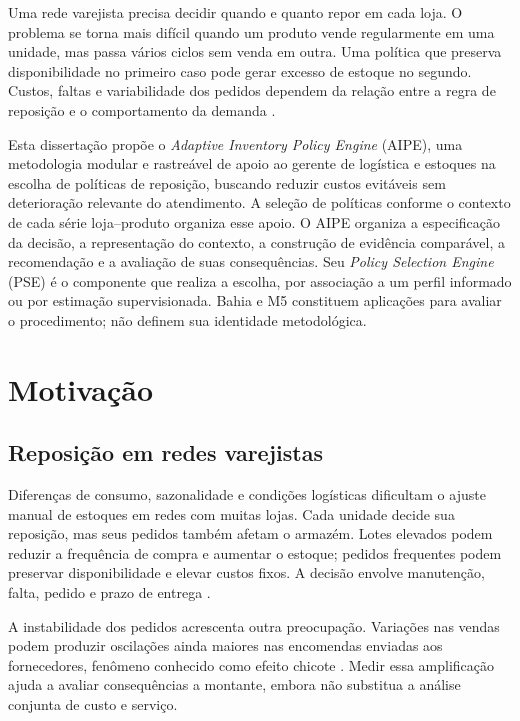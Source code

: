 
Uma rede varejista precisa decidir quando e quanto repor em cada loja. O problema se torna mais difícil quando um produto vende regularmente em uma unidade, mas passa vários ciclos sem venda em outra. Uma política que preserva disponibilidade no primeiro caso pode gerar excesso de estoque no segundo. Custos, faltas e variabilidade dos pedidos dependem da relação entre a regra de reposição e o comportamento da demanda \citep{Axsater2006InventoryControl,Syntetos2005Categorization}.

Esta dissertação propõe o \textit{Adaptive Inventory Policy Engine} (AIPE), uma metodologia modular e rastreável de apoio ao gerente de logística e estoques na escolha de políticas de reposição, buscando reduzir custos evitáveis sem deterioração relevante do atendimento. A seleção de políticas conforme o contexto de cada série loja--produto organiza esse apoio. O AIPE organiza a especificação da decisão, a representação do contexto, a construção de evidência comparável, a recomendação e a avaliação de suas consequências. Seu \textit{Policy Selection Engine} (PSE) é o componente que realiza a escolha, por associação a um perfil informado ou por estimação supervisionada. Bahia e M5 constituem aplicações para avaliar o procedimento; não definem sua identidade metodológica.

\section{Motivação}

\subsection{Reposição em redes varejistas}

Diferenças de consumo, sazonalidade e condições logísticas dificultam o ajuste manual de estoques em redes com muitas lojas. Cada unidade decide sua reposição, mas seus pedidos também afetam o armazém. Lotes elevados podem reduzir a frequência de compra e aumentar o estoque; pedidos frequentes podem preservar disponibilidade e elevar custos fixos. A decisão envolve manutenção, falta, pedido e prazo de entrega \citep{Axsater2006InventoryControl,Zipkin2000FoundationsInventory}.

A instabilidade dos pedidos acrescenta outra preocupação. Variações nas vendas podem produzir oscilações ainda maiores nas encomendas enviadas aos fornecedores, fenômeno conhecido como efeito chicote \citep{LeePadmanabhanWhang1997Bullwhip}. Medir essa amplificação ajuda a avaliar consequências a montante, embora não substitua a análise conjunta de custo e serviço.


